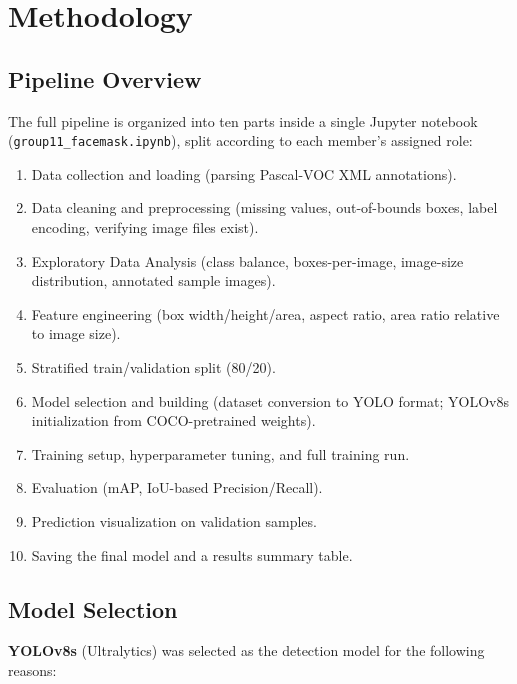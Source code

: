 \documentclass[12pt]{article}
\begin{document}
\section{Methodology}
\label{sec:methodology}

\subsection{Pipeline Overview}
The full pipeline is organized into ten parts inside a single Jupyter
notebook (\texttt{group11\_facemask.ipynb}), split according to each
member's assigned role:

\begin{enumerate}[noitemsep]
    \item Data collection and loading (parsing Pascal-VOC XML annotations).
    \item Data cleaning and preprocessing (missing values, out-of-bounds
          boxes, label encoding, verifying image files exist).
    \item Exploratory Data Analysis (class balance, boxes-per-image,
          image-size distribution, annotated sample images).
    \item Feature engineering (box width/height/area, aspect ratio,
          area ratio relative to image size).
    \item Stratified train/validation split (80/20).
    \item Model selection and building (dataset conversion to YOLO format;
          YOLOv8s initialization from COCO-pretrained weights).
    \item Training setup, hyperparameter tuning, and full training run.
    \item Evaluation (mAP, IoU-based Precision/Recall).
    \item Prediction visualization on validation samples.
    \item Saving the final model and a results summary table.
\end{enumerate}

\subsection{Model Selection}
\textbf{YOLOv8s} (Ultralytics) was selected as the detection model for the
following reasons:
\end{document}

